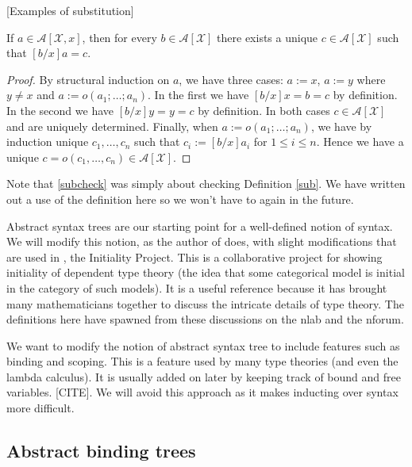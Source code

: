 [Examples of substitution]

\begin{cor}\label{subcheck}
    If $a \in \mathcal{A}[\mathcal{X},x]$, then for every $b \in \mathcal{A}[\mathcal{X}]$ there exists a unique $c \in \mathcal{A}[\mathcal{X}]$ such that $[b/x]a = c$.
\end{cor}
\begin{proof}
    By structural induction on $a$, we have three cases: $a := x$, $a:=y$ where $y \ne x$ and $a := o(a_1; \dots; a_n)$. In the first we have $[b/x]x=b=c$ by definition. In the second we have $[b/x]y=y=c$ by definition. In both cases $c \in \mathcal{A}[\mathcal{X}]$ and are uniquely determined. Finally, when $a := o(a_1; \dots; a_n)$, we have by induction unique $c_1,\dots, c_n$ such that $c_i:=[b/x]a_i$ for $1 \le i \le n$. Hence we have a unique $c=o(c_1,\dots,c_n) \in \mathcal{A}[\mathcal{X}]$.
\end{proof}

\begin{remark}
    Note that \ref{subcheck} was simply about checking Definition \ref{sub}. We have written out a use of the definition here so we won't have to again in the future.
\end{remark}

Abstract syntax trees are our starting point for a well-defined notion of syntax. We will modify this notion, as the author of \cite{harper_2016} does, with slight modifications that are used in \cite{nlab:initiality_project, nlab:initiality_project_-_raw_syntax}, the Initiality Project. This is a collaborative project for showing initiality of dependent type theory (the idea that some categorical model is initial in the category of such models). It is a useful reference because it has brought many mathematicians together to discuss the intricate details of type theory. The definitions here have spawned from these discussions on the nlab and the nforum.

We want to modify the notion of abstract syntax tree to include features such as binding and scoping. This is a feature used by many type theories (and even the lambda calculus). It is usually added on later by keeping track of bound and free variables. [CITE]. We will avoid this approach as it makes inducting over syntax more difficult.

\subsection{Abstract binding trees}

